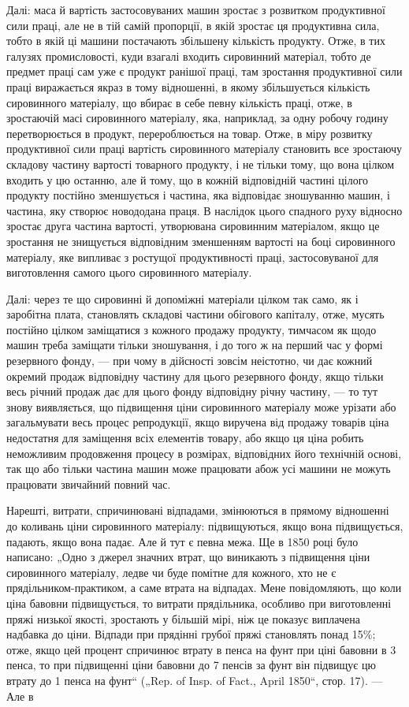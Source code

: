 Далі: маса й вартість застосовуваних машин зростає з розвитком
продуктивної сили праці, але не в тій самій пропорції,
в якій зростає ця продуктивна сила, тобто в якій ці машини
постачають збільшену кількість продукту. Отже, в тих галузях
промисловості, куди взагалі входить сировинний матеріал, тобто
де предмет праці сам уже є продукт ранішої праці, там зростання
продуктивної сили праці виражається якраз в тому відношенні,
в якому збільшується кількість сировинного матеріалу,
що вбирає в себе певну кількість праці, отже, в зростаючій масі
сировинного матеріалу, яка, наприклад, за одну робочу годину перетворюється
в продукт, перероблюється на товар. Отже, в
міру розвитку продуктивної сили праці вартість сировинного
матеріалу становить все зростаючу складову частину вартості
товарного продукту, і не тільки тому, що вона цілком входить
у цю останню, але й тому, що в кожній відповідній частині
цілого продукту постійно зменшується і частина, яка відповідає
зношуванню машин, і частина, яку створює новододана праця.
В наслідок цього спадного руху відносно зростає друга частина
вартості, утворювана сировинним матеріалом, якщо це зростання
не знищується відповідним зменшенням вартості на боці сировинного
матеріалу, яке випливає з ростущої продуктивності
праці, застосовуваної для виготовлення самого цього сировинного
матеріалу.

Далі: через те що сировинні й допоміжні матеріали цілком
так само, як і заробітна плата, становлять складові частини
обігового капіталу, отже, мусять постійно цілком заміщатися
з кожного продажу продукту, тимчасом як щодо машин треба
заміщати тільки зношування, і до того ж на перший час у формі
резервного фонду, — при чому в дійсності зовсім неістотно, чи
дає кожний окремий продаж відповідну частину для цього
резервного фонду, якщо тільки весь річний продаж дає для
цього фонду відповідну річну частину, — то тут знову виявляється,
що підвищення ціни сировинного матеріалу може урізати
або загальмувати весь процес репродукції, якщо виручена
від продажу товарів ціна недостатня для заміщення всіх елементів
товару, або якщо ця ціна робить неможливим продовження
процесу в розмірах, відповідних його технічній основі,
так що або тільки частина машин може працювати абож усі
машини не можуть працювати звичайний повний час.

Нарешті, витрати, спричинювані відпадами, змінюються в прямому
відношенні до коливань ціни сировинного матеріалу: підвищуються,
якщо вона підвищується, падають, якщо вона падає. Але
й тут є певна межа. Ще в 1850 році було написано: „Одно з джерел
значних втрат, що виникають з підвищення ціни сировинного
матеріалу, ледве чи буде помітне для кожного, хто не є
прядільником-практиком, а саме втрата на відпадах. Мене повідомляють,
що коли ціна бавовни підвищується, то витрати прядільника,
особливо при виготовленні пряжі низької якості, зростають
у більшій мірі, ніж це показує виплачена надбавка до
ціни. Відпади при прядінні грубої пряжі становлять понад 15\%;
отже, якщо цей процент спричинює втрату в  пенса на фунт
при ціні бавовни в 3 пенса, то при підвищенні ціни бавовни
до 7 пенсів за фунт він підвищує цю втрату до 1 пенса на
фунт“ („Rep. of Insp. of Fact., April 1850“, стор. 17). — Але в
\parbreak{}  %
